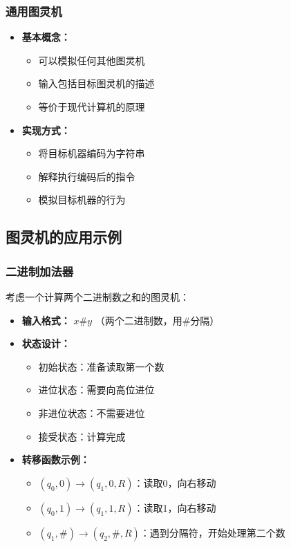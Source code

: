 \documentclass[a4paper,12pt]{ctexart}
\begin{document}
\subsubsection{通用图灵机}
\begin{itemize}
    \item \textbf{基本概念：}
        \begin{itemize}
            \item 可以模拟任何其他图灵机
            \item 输入包括目标图灵机的描述
            \item 等价于现代计算机的原理
        \end{itemize}
    \item \textbf{实现方式：}
        \begin{itemize}
            \item 将目标机器编码为字符串
            \item 解释执行编码后的指令
            \item 模拟目标机器的行为
        \end{itemize}
\end{itemize}

\subsection{图灵机的应用示例}
\subsubsection{二进制加法器}
考虑一个计算两个二进制数之和的图灵机：
\begin{itemize}
    \item \textbf{输入格式：} $x\#y$ （两个二进制数，用\#分隔）
    \item \textbf{状态设计：}
        \begin{itemize}
            \item 初始状态：准备读取第一个数
            \item 进位状态：需要向高位进位
            \item 非进位状态：不需要进位
            \item 接受状态：计算完成
        \end{itemize}
    \item \textbf{转移函数示例：}
        \begin{itemize}
            \item $(q_0,0) \rightarrow (q_1,0,R)$：读取0，向右移动
            \item $(q_0,1) \rightarrow (q_1,1,R)$：读取1，向右移动
            \item $(q_1,\#) \rightarrow (q_2,\#,R)$：遇到分隔符，开始处理第二个数
        \end{itemize}
\end{itemize}
\end{document}
